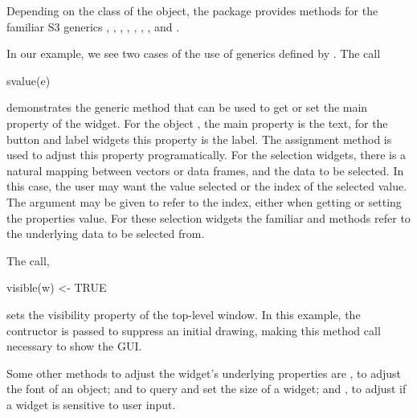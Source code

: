 Depending on the class of the object, the  package provides methods
for the familiar S3 generics \generic{[}, \generic{[$<$-},
, , , ,
,  and .


In our example, we see two cases of the use of generics defined by
. The call
\begin{Schunk}
\begin{Sinput}
 svalue(e)
\end{Sinput}
\end{Schunk}
%
demonstrates the generic method  that can be used
to get or set the main property of the widget. For the object
, the main property is the text, for the button and label
widgets this property is the label. The 
assignment method is used to adjust this property programatically.
For the selection widgets, there is a natural mapping between vectors
or data frames, and the data to be selected. In this case, the user
may want the value selected or the index of the selected value. The
 argument may be given to refer to the index, either
when getting or setting the properties value. For these selection
widgets the familiar \meth{[} and \meth{[\ASSIGN} methods refer to the
underlying data to be selected from.



The call, 
\begin{Schunk}
\begin{Sinput}
 visible(w) <- TRUE
\end{Sinput}
\end{Schunk}
%
sets the visibility property of the top-level window. In this example,
the  contructor is passed  to
suppress an initial drawing, making this method call necessary to show
the GUI.

Some other methods to adjust the widget's underlying properties are ,
to adjust the font of an object;  and  to
query and set the size of a widget; and , to adjust
if a widget is sensitive to user input. 


